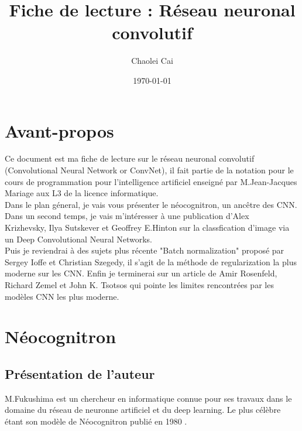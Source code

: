 \documentclass[12pt, letterpaper]{article}
\title{Fiche de lecture : Réseau neuronal convolutif}
\author{Chaolei Cai
\\
    \multicolumn{1}{
        p{.7\textwidth}}{\centering\emph{Université Paris Vincennes St-Denis\\
  UFR mathématiques, informatique, technologies sciences de l'information\\}
  L3 Informatique}
}
\date{\today}
\begin{document}
\begin{titlepage}
    \maketitle
\end{titlepage}

\tableofcontents

\section{Avant-propos}
Ce document est ma fiche de lecture sur le réseau neuronal convolutif (Convolutional Neural Network or ConvNet), il fait partie de la notation pour 
le cours de programmation pour l'intelligence artificiel enseigné par M.Jean-Jacques Mariage aux L3 de la licence informatique.\\
Dans le plan géneral, je vais vous présenter le néocognitron, un ancêtre des CNN.\\
Dans un second temps, je vais m'intéresser à une publication d'Alex \\Krizhevsky, Ilya Sutskever et Geoffrey E.Hinton sur la classfication d'image via un Deep Convolutional Neural Networks.\\
Puis je reviendrai à des sujets plus récente "Batch normalization" proposé par Sergey Ioffe et Christian Szegedy, il s'agit de la méthode de regularization la plus moderne sur les CNN.
Enfin je terminerai sur un article de Amir Rosenfeld, Richard Zemel et John K. Tsotsos qui pointe les limites rencontrées par les modèles CNN les plus moderne.

\section{Néocognitron}
\subsection{Présentation de l'auteur}
M.Fukushima est un chercheur en informatique connue pour ses travaux dans le domaine du réseau de neuronne artificiel et du deep learning.
Le plus célèbre étant son modèle de Néocognitron publié en 1980 \autocite{Fukushima:1}.
\end{document}
